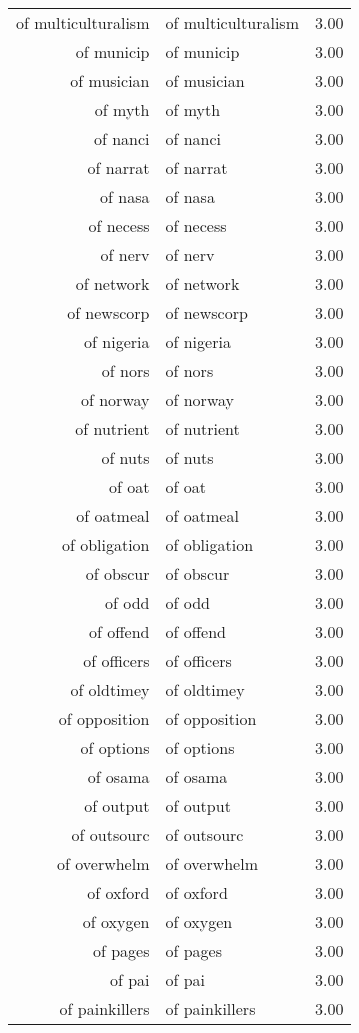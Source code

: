 \begin{table}[ht]
\begin{tabular}{rlr}
  of multiculturalism & of multiculturalism & 3.00 \\ 
  of municip & of municip & 3.00 \\ 
  of musician & of musician & 3.00 \\ 
  of myth & of myth & 3.00 \\ 
  of nanci & of nanci & 3.00 \\ 
  of narrat & of narrat & 3.00 \\ 
  of nasa & of nasa & 3.00 \\ 
  of necess & of necess & 3.00 \\ 
  of nerv & of nerv & 3.00 \\ 
  of network & of network & 3.00 \\ 
  of newscorp & of newscorp & 3.00 \\ 
  of nigeria & of nigeria & 3.00 \\ 
  of nors & of nors & 3.00 \\ 
  of norway & of norway & 3.00 \\ 
  of nutrient & of nutrient & 3.00 \\ 
  of nuts & of nuts & 3.00 \\ 
  of oat & of oat & 3.00 \\ 
  of oatmeal & of oatmeal & 3.00 \\ 
  of obligation & of obligation & 3.00 \\ 
  of obscur & of obscur & 3.00 \\ 
  of odd & of odd & 3.00 \\ 
  of offend & of offend & 3.00 \\ 
  of officers & of officers & 3.00 \\ 
  of oldtimey & of oldtimey & 3.00 \\ 
  of opposition & of opposition & 3.00 \\ 
  of options & of options & 3.00 \\ 
  of osama & of osama & 3.00 \\ 
  of output & of output & 3.00 \\ 
  of outsourc & of outsourc & 3.00 \\ 
  of overwhelm & of overwhelm & 3.00 \\ 
  of oxford & of oxford & 3.00 \\ 
  of oxygen & of oxygen & 3.00 \\ 
  of pages & of pages & 3.00 \\ 
  of pai & of pai & 3.00 \\ 
  of painkillers & of painkillers & 3.00 \\ 

\end{tabular}
\end{table}
